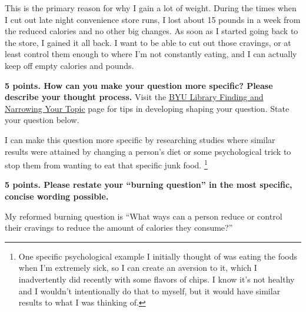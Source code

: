 \documentclass[title={Credible Sources - Formulate Question},points={20}]{fdsn201homework}
\begin{document}
\begin{problems}
\begin{answer}
		This is the primary reason for why I gain a lot of weight. During the times when I cut out late night convenience store runs, I lost about 15 pounds in a week from the reduced calories and no other big changes.
		As soon as I started going back to the store, I gained it all back. I want to be able to cut out those cravings, or at least control them enough to where I'm not constantly eating, and I can actually keep off empty calories and pounds.
	\end{answer}
	\item \textbf{5 points. How can you make your question more specific?
	Please describe your thought process.}
	Visit the \href{https://guides.lib.byu.edu/c.php?g=216340&p=1428396}{BYU Library Finding and Narrowing Your Topic} page for tips in developing shaping your question.
	State your question below.
	\begin{answer}
		I can make this question more specific by researching studies where similar results were attained by changing a person's diet or some psychological trick to stop them from wanting to eat that specific junk food.%
		\footnote{One specific psychological example I initially thought of was eating the foods when I'm extremely sick, so I can create an aversion to it, which I inadvertently did recently with some flavors of chips.
		I know it's not healthy and I wouldn't intentionally do that to myself, but it would have similar results to what I was thinking of.}
	\end{answer}
	\item \textbf{5 points. Please restate your ``burning question'' in the most specific, concise wording possible.}
	\begin{answer}
		My reformed burning question is ``What ways can a person reduce or control their cravings to reduce the amount of calories they consume?''
	\end{answer}
\end{problems}
\end{document}
